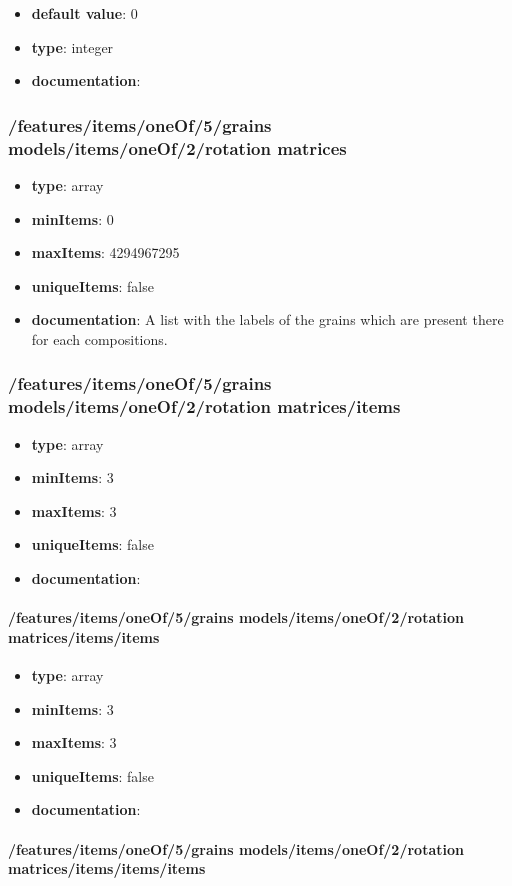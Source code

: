 \begin{itemize}\item {\bf default value}: 0
\item {\bf type}: integer
\item {\bf documentation}: 
\end{itemize}\subsubsection{/features/items/oneOf/5/grains models/items/oneOf/2/rotation matrices}
\begin{itemize}\item {\bf type}: array
\item {\bf minItems}: 0
\item {\bf maxItems}: 4294967295
\item {\bf uniqueItems}: false
\item {\bf documentation}: A list with the labels of the grains which are present there for each compositions.
\end{itemize}\subsubsection{/features/items/oneOf/5/grains models/items/oneOf/2/rotation matrices/items}
\begin{itemize}\item {\bf type}: array
\item {\bf minItems}: 3
\item {\bf maxItems}: 3
\item {\bf uniqueItems}: false
\item {\bf documentation}: 
\end{itemize}\paragraph{/features/items/oneOf/5/grains models/items/oneOf/2/rotation matrices/items/items}
\begin{itemize}\item {\bf type}: array
\item {\bf minItems}: 3
\item {\bf maxItems}: 3
\item {\bf uniqueItems}: false
\item {\bf documentation}: 
\end{itemize}\paragraph{/features/items/oneOf/5/grains models/items/oneOf/2/rotation matrices/items/items/items}
